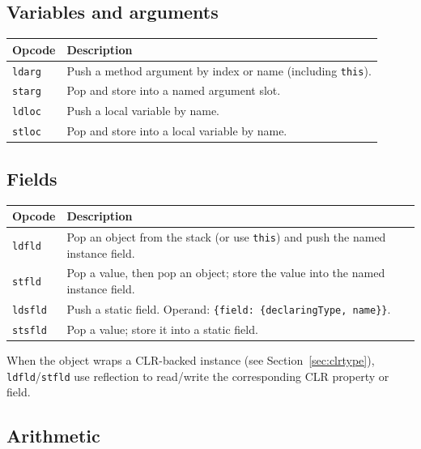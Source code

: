 \documentclass[11pt,a4paper]{article}
\begin{document}
\subsection{Variables and arguments}

\begin{center}
\begin{tabular}{lp{9cm}}
\toprule
\textbf{Opcode} & \textbf{Description} \\
\midrule
\texttt{ldarg}  & Push a method argument by index or name (including \texttt{this}). \\
\texttt{starg}  & Pop and store into a named argument slot. \\
\texttt{ldloc}  & Push a local variable by name. \\
\texttt{stloc}  & Pop and store into a local variable by name. \\
\bottomrule
\end{tabular}
\end{center}

\subsection{Fields}

\begin{center}
\begin{tabular}{lp{9cm}}
\toprule
\textbf{Opcode} & \textbf{Description} \\
\midrule
\texttt{ldfld}  & Pop an object from the stack (or use \texttt{this}) and push the named instance field. \\
\texttt{stfld}  & Pop a value, then pop an object; store the value into the named instance field. \\
\texttt{ldsfld} & Push a static field.  Operand: \texttt{\{field: \{declaringType, name\}\}}. \\
\texttt{stsfld} & Pop a value; store it into a static field. \\
\bottomrule
\end{tabular}
\end{center}

\noindent When the object wraps a CLR-backed instance
(see Section~\ref{sec:clrtype}), \texttt{ldfld}/\texttt{stfld} use
reflection to read/write the corresponding CLR property or field.

\subsection{Arithmetic}
\end{document}
